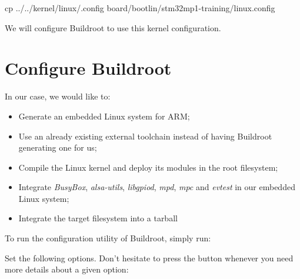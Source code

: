 \begin{bashinput}
cp ../../kernel/linux/.config board/bootlin/stm32mp1-training/linux.config
\end{bashinput}

We will configure Buildroot to use this kernel configuration.

\section{Configure Buildroot}

In our case, we would like to:

\begin{itemize}
\item Generate an embedded Linux system for ARM;
\item Use an already existing external toolchain instead of having
  Buildroot generating one for us;
\item Compile the Linux kernel and deploy its modules in the root
  filesystem;
\item Integrate {\em BusyBox}, {\em alsa-utils}, {\em libgpiod},
  {\em mpd}, {\em mpc} and {\em evtest} in our embedded Linux system;
\item Integrate the target filesystem into a tarball
\end{itemize}

To run the configuration utility of Buildroot, simply run:


Set the following options. Don't hesitate to press the 
button whenever you need more details about a given option:

